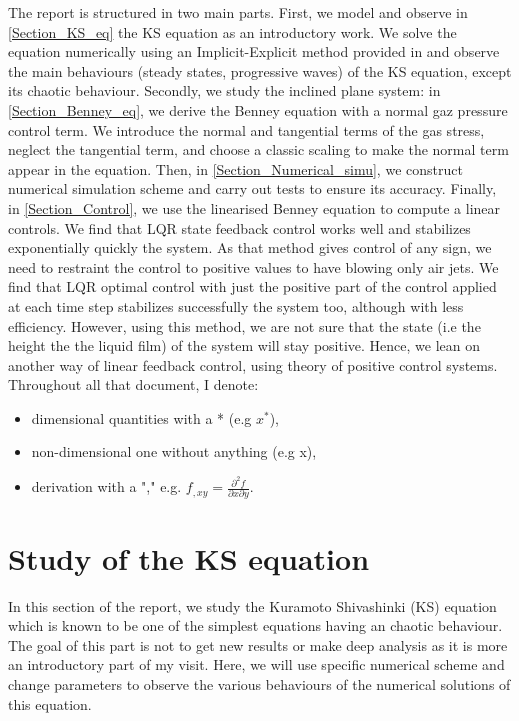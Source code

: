 \documentclass[12pt]{article}
\begin{document}
The report is structured in two main parts. First, we model and observe in \eqref{Section_KS_eq} the KS equation as an introductory work. We solve the equation numerically using an Implicit-Explicit method provided in \cite{Scheme_for_KS} and observe the main behaviours (steady states, progressive waves) of the KS equation, except its chaotic behaviour. Secondly, we study the inclined plane system: in \eqref{Section_Benney_eq}, we derive the Benney equation with a normal gaz pressure control term. We introduce the normal and tangential terms of the gas stress, neglect the tangential term, and choose a classic scaling to make the normal term appear in the equation.  Then, in \eqref{Section_Numerical_simu}, we construct numerical simulation scheme and carry out tests to ensure its accuracy. Finally, in \eqref{Section_Control}, we use the linearised Benney equation to compute a linear controls. We find that LQR state feedback control works well and stabilizes exponentially quickly the system. As that method gives control of any sign, we need to restraint the control to positive values to have blowing only air jets. We find that LQR optimal control with just the positive part of the control applied at each time step stabilizes successfully the system too, although with less efficiency. However, using this method, we are not sure that the state (i.e the height the the liquid film) of the system will stay positive. Hence, we lean on another way of linear feedback control, using theory of positive control systems. 
\\

Throughout all that document, I denote: 
\begin{itemize}
    \item dimensional quantities with a * (e.g $x^*$), 
    \item non-dimensional one without anything (e.g x), 
    \item derivation with a "," e.g. $f_{,xy} = \frac{\partial^2 f}{\partial x\partial y}.$
\end{itemize}

\newpage
\section{Study of the KS equation}\label{Section_KS_eq}


In this section of the report, we study the Kuramoto Shivashinki (KS) equation which is known to be one of the simplest equations having an chaotic behaviour.  The goal of this part is not to get new results or make deep analysis as it is more an introductory part of my visit. Here, we will use specific numerical scheme and change parameters to observe the various behaviours of the numerical solutions of this equation. 
\end{document}

